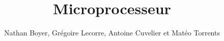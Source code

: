 \documentclass{beamer}
\title{Microprocesseur}
\author{Nathan Boyer, Grégoire Lecorre, Antoine Cuvelier et Matéo Torrents}
\begin{document}
\frame{\titlepage}
\end{document}

